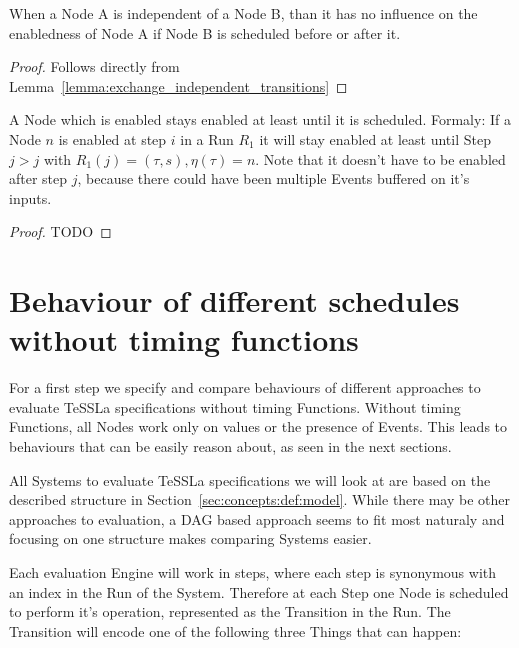 \begin{lemma}[name = Influence of independent Nodes]\label{lemma:independent_nodes}
  When a Node A is independent of a Node B, than it has no influence on the enabledness of Node A if Node B is scheduled before or after it.
\end{lemma}

\begin{proof}
  Follows directly from Lemma~\ref{lemma:exchange_independent_transitions}
\end{proof}

\begin{lemma}[name = Duration of Enabledness]\label{lemma:enabled_till_scheduled}
  A Node which is enabled stays enabled at least until it is scheduled.
  Formaly: If a Node \(n\) is enabled at step \(i\) in a Run \(R_1\) it will stay enabled at least until Step \(j > j\) with \(R_1(j) = (\tau,s), \eta(\tau) = n\).
  Note that it doesn't have to be enabled after step \(j\), because there could have been multiple Events buffered on it's inputs.
\end{lemma}

\begin{proof}
TODO
\end{proof}


\section{Behaviour of different schedules without timing functions}
\label{sec:concepts:behaviour_without_timing}

For a first step we specify and compare behaviours of different approaches to evaluate TeSSLa specifications without timing Functions.
Without timing Functions, all Nodes work only on values or the presence of Events.
This leads to behaviours that can be easily reason about, as seen in the next sections.

All Systems to evaluate TeSSLa specifications we will look at are based on the described structure in Section~\ref{sec:concepts:def:model}.
While there may be other approaches to evaluation, a DAG based approach seems to fit most naturaly and focusing on one structure makes comparing Systems easier.

Each evaluation Engine will work in steps, where each step is synonymous with an index in the Run of the System.
Therefore at each Step one Node is scheduled to perform it's operation, represented as the Transition in the Run.
The Transition will encode one of the following three Things that can happen:

